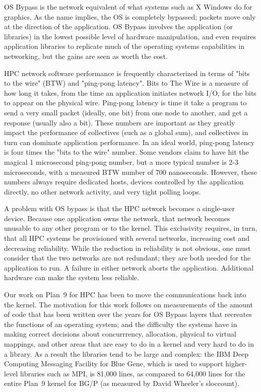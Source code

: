 \documentclass[letterpaper,twocolumn,10pt]{article}
\begin{document}
OS Bypass is the network equivalent of what systems such as X Windows do for graphics. 
As the name implies, the OS is completely bypassed; packets move only at the 
direction of the application. OS Bypass involves the application (or libraries) in the
lowest possible level of hardware manipulation, and even requires
application libraries to replicate much of the operating systems
capabilities in networking, but the gains are seen as worth the cost.

HPC network software performance is frequently characterized in terms of "bits to the wire" (BTW) and "ping-pong latency". 
Bits to The Wire is a measure of how long it takes, 
from the time an application initiates
network I/O, for the bits to appear on the physical wire. Ping-pong latency 
is time it take a program to send a very small packet (ideally, one bit) from 
one node to another, and get a response (usually also a bit). 
These numbers are important as they greatly impact the performance of collectives (such as a global sum), 
and collectives in turn can dominate application performance\cite{petrini}\cite{ 10.1109/HPC.1997.592137}\cite{quadrics}.
In an ideal world, ping-pong latency is four times the "bits to the wire" number. 
Some vendors claim to have hit the magical 1 microsecond ping-pong number, but a more typical 
number is 2-3 microseconds, with a measured BTW number of 700 nanoseconds. 
However, these numbers always require dedicated hosts, devices
controlled by the application directly, no other network activity, 
and very tight polling loops. 

A problem with OS bypass is that the HPC network becomes a single-user device. Because one application 
owns the network, that network becomes unusable to any other program or to the kernel. This exclusivity requires, in turn, that all
HPC systems be provisioned with several networks, increasing cost and decreasing reliability. While the reduction in reliability is not obvious, one must consider 
that the two networks are not redundant; they are both needed for the application
to run. A failure in either network aborts the application. Additional hardware can make the system less reliable. 

Our work on Plan~9 for HPC has been to move the communications back into the kernel. The motivation 
for this work follows on measurements of the amount of  code that has been written over the years for OS Bypass layers that recreates the functions of an operating system; 
and the difficulty the systems have in making correct decisions about concurrrency, allocation, physical to virtual mappings, and other 
areas that are easy to do in a kernel and very hard to do in a library. As a result the libraries tend to be large and complex: the IBM Deep Computing Messaging Facility for Blue Gene, which is used to support
higher-level libraries such as MPI, is 81,000 lines, as compared to 64,000 lines for the entire Plan~9 kernel  for BG/P (as measured by David Wheeler's sloccount). 
\end{document}
